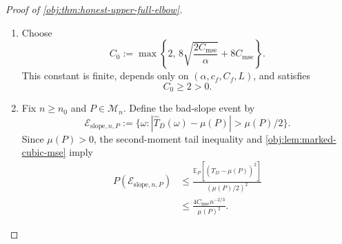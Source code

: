 \begin{proof}[Proof of \cref{obj:thm:honest-upper-full-elbow}]
\begin{enumerate}
For coverage, fix \(P\in\mathcal M_n\).
 supplies
\[
\mu(P)=T_D(P)>0,\qquad
\theta(P)=\frac{T_Y(P)}{\mu(P)}\in[-1,1],
\qquad
T_Y(P)=\theta(P)\mu(P).
\]
If \(n<n_0\), the interval equals \(\Theta\), and therefore
\[
P\{\theta(P)\in I_n\}=1\ge1-\alpha.
\]
Suppose now that \(n\ge n_0\). For each \(A\in\{Y,D\}\), define the error event
\[
\mathcal E_{A,n}
:=
\{\omega:|\widehat T_A(\omega)-T_A(P)|>r_n\}.
\]
The radius is strictly positive and satisfies
\[
r_n^2=\frac{2C_{\mathrm{mse}}}{\alpha}\,n^{-2/3}.
\]
Applying the second-moment tail inequality and
\cref{obj:lem:marked-cubic-mse} gives
\[
P(\mathcal E_{A,n})
\le
\frac{\mathbb E_P[(\widehat T_A-T_A(P))^2]}{r_n^2}
\le
\frac{C_{\mathrm{mse}}n^{-2/3}}
     {(2C_{\mathrm{mse}}/\alpha)n^{-2/3}}
=\frac{\alpha}{2}.
\]

Define the simultaneous good event by
\[
\mathcal E_{\mathrm{cov},n}
:=(\mathcal E_{Y,n}\cup\mathcal E_{D,n})^c.
\]
On this event, identification and the triangle inequality yield
\[
\begin{aligned}
|\widehat T_Y-\theta(P)\widehat T_D|
&=
|(\widehat T_Y-T_Y(P))
 +\theta(P)(\mu(P)-\widehat T_D)|\\
&\le|\widehat T_Y-T_Y(P)|
  +|\theta(P)|\,|\widehat T_D-\mu(P)|\\
&\le2r_n.
\end{aligned}
\]
Hence \(\theta(P)\in\mathcal A_n\), so the acceptance set is nonempty and
\(\theta(P)\in I_n\). The union bound therefore gives
\[
P\{\theta(P)\in I_n\}
\ge P(\mathcal E_{\mathrm{cov},n})
\ge1-P(\mathcal E_{Y,n})-P(\mathcal E_{D,n})
\ge1-\alpha.
\]
Together with the measurable graph and connectedness established above,
this proves \(I_n\in\mathfrak H_n\) for every positive integer \(n\), by
\cref{obj:def:honest-intervals}.

\item
Choose
\[
C_0:=
\max\left\{
2,\,
8\sqrt{\frac{2C_{\mathrm{mse}}}{\alpha}}
+8C_{\mathrm{mse}}
\right\}.
\]
This constant is finite, depends only on
\((\alpha,c_f,C_f,L)\), and satisfies
\[
C_0\ge2>0.
\]

\item
Fix \(n\ge n_0\) and \(P\in\mathcal M_n\). Define the bad-slope event by
\[
\mathcal E_{\mathrm{slope},n,P}
:=
\{\omega:|\widehat T_D(\omega)-\mu(P)|>\mu(P)/2\}.
\]
Since \(\mu(P)>0\), the second-moment tail inequality and
\cref{obj:lem:marked-cubic-mse} imply
\[
\begin{aligned}
P(\mathcal E_{\mathrm{slope},n,P})
&\le
\frac{\mathbb E_P[(\widehat T_D-\mu(P))^2]}
     {(\mu(P)/2)^2}\\
&\le
\frac{4C_{\mathrm{mse}}n^{-2/3}}{\mu(P)^2}.
\end{aligned}
\]


\end{enumerate}
\end{proof}
